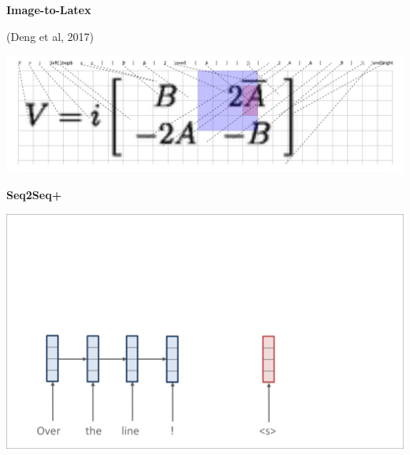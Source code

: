 \documentclass[aspectratio=169]{beamer}
\newcommand{\air}{\vspace{0.25cm}}
\begin{document}
\begin{frame}
  \centerline{\textbf{Image-to-Latex}}

  \centerline{\small (Deng et al, 2017)}
\air

  \begin{center}
    \includegraphics[width=0.9\linewidth]{ImageMark}
  \end{center}
\end{frame}



\begin{frame}
  \begin{center}
    \textbf{Seq2Seq+}  \air
  \end{center}
\center
\vspace{-5mm}
 \air
\includegraphics[scale=0.37]{nmt-attn1}
\end{frame}
\end{document}
